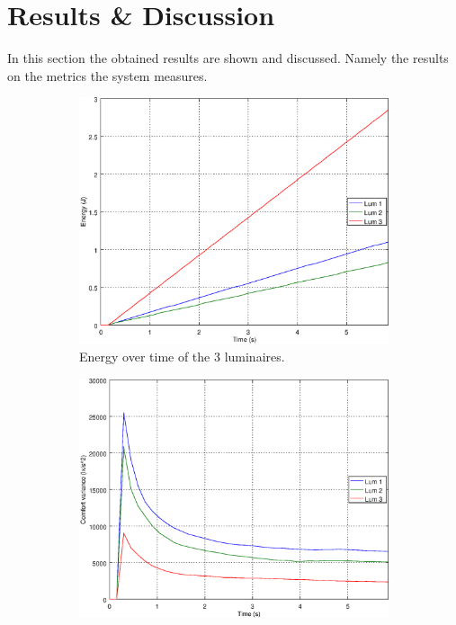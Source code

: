 \section{Results \& Discussion}\label{results}


In this section the obtained results are shown and discussed. Namely the results on the metrics the system measures.

\begin{figure}[ht]
    \centering
    \begin{subfigure}[t]{0.32\textwidth}
    \centering
    \includegraphics[width=.95\textwidth]{img/e_closed_o000}
    \caption{Energy over time of the 3 luminaires.}
    \label{fig:e_closed_o000}
    \end{subfigure}
    \begin{subfigure}[t]{0.32\textwidth}
    \centering
    \includegraphics[width=.95\textwidth]{img/f_closed_o000}

\end{subfigure}
\end{figure}
